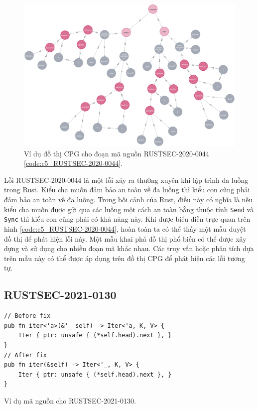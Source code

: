 \begin{figure}[H]
    \includegraphics[width=1\columnwidth]{figures/c5/c5_RUSTSEC-2020-0044.png}
    \centering
    \caption{Ví dụ đồ thị CPG cho đoạn mã nguồn RUSTSEC-2020-0044 \ref{code:c5_RUSTSEC-2020-0044}.}
    \label{img:c5_RUSTSEC-2020-0044}
\end{figure}

Lỗi RUSTSEC-2020-0044 là một lỗi xảy ra thường xuyên khi lập trình đa luồng trong Rust.
Kiểu cha muốn đảm bảo an toàn về đa luồng thì kiểu con cũng phải đảm bảo an toàn về đa luồng.
Trong bối cảnh của Rust, điều này có nghĩa là nếu kiểu cha muốn được gửi qua các luồng một cách an toàn bằng thuộc tính \texttt{Send} và \texttt{Sync} thì kiểu con cũng phải có khả năng này.
Khi được biểu diễn trực quan trên hình \ref{code:c5_RUSTSEC-2020-0044}, hoàn toàn ta có thể thấy một mẫu duyệt đồ thị để phát hiện lỗi này.
Một mẫu khai phá đồ thị phổ biến có thể được xây dựng và sử dụng cho nhiều đoạn mã khác nhau.
Các truy vấn hoặc phân tích dựa trên mẫu này có thể được áp dụng trên đồ thị CPG để phát hiện các lỗi tương tự.

\subsection{RUSTSEC-2021-0130}

\begin{listing}[H]
\begin{verbatim}
// Before fix
pub fn iter<'a>(&'_ self) -> Iter<'a, K, V> {
    Iter { ptr: unsafe { (*self.head).next }, }
}
// After fix
pub fn iter(&self) -> Iter<'_, K, V> {
    Iter { ptr: unsafe { (*self.head).next }, }
}
\end{verbatim}
\caption{Ví dụ mã nguồn cho RUSTSEC-2021-0130.}
\label{code:c5_RUSTSEC-2021-0130}
\end{listing}



